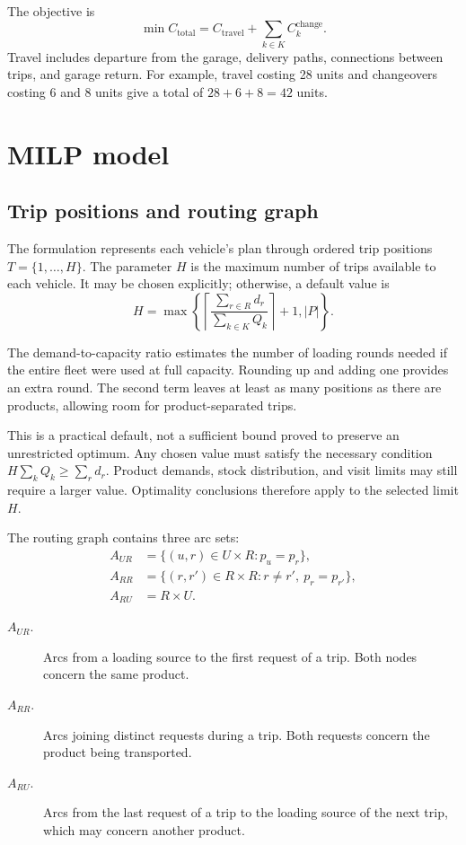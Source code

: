 The objective is
\begin{equation}
\min C_{\mathrm{total}}=C_{\mathrm{travel}}+
\sum_{k\in K}C_k^{\mathrm{change}}.
\label{eq:common-objective}
\end{equation}
Travel includes departure from the garage, delivery paths, connections between
trips, and garage return. For example, travel costing 28 units and changeovers
costing 6 and 8 units give a total of $28+6+8=42$ units.

\section{MILP model}\label{sec:milp-model}
\subsection{Trip positions and routing graph}
The formulation represents each vehicle's plan through ordered trip positions
$T=\{1,\ldots,H\}$. The parameter $H$ is the maximum number of trips available
to each vehicle. It may be chosen explicitly; otherwise, a default value is
\begin{equation}
H=\max\left\{
\left\lceil\frac{\sum_{r\in R}d_r}{\sum_{k\in K}Q_k}\right\rceil+1,
|P|\right\}.
\label{eq:trip-horizon}
\end{equation}

The demand-to-capacity ratio estimates the number of loading rounds needed
if the entire fleet were used at full capacity. Rounding up and adding one
provides an extra round. The second term leaves at least as many positions
as there are products, allowing room for product-separated trips.

This is a practical default, not a sufficient bound proved to preserve an
unrestricted optimum. Any chosen value must satisfy the necessary condition
$H\sum_kQ_k\geq\sum_rd_r$. Product demands, stock distribution, and visit
limits may still require a larger value. Optimality conclusions therefore
apply to the selected limit $H$.

The routing graph contains three arc sets:
\begin{align}
A_{UR}&=\{(u,r)\in U\times R:p_u=p_r\},\label{eq:arcs-ur}\\
A_{RR}&=\{(r,r')\in R\times R:r\neq r',\ p_r=p_{r'}\},\label{eq:arcs-rr}\\
A_{RU}&=R\times U.\label{eq:arcs-ru}
\end{align}
\begin{description}
\item[$A_{UR}$.] Arcs from a loading source to the first request of a trip.
Both nodes concern the same product.
\item[$A_{RR}$.] Arcs joining distinct requests during a trip. Both requests
concern the product being transported.
\item[$A_{RU}$.] Arcs from the last request of a trip to the loading source
of the next trip, which may concern another product.
\end{description}

